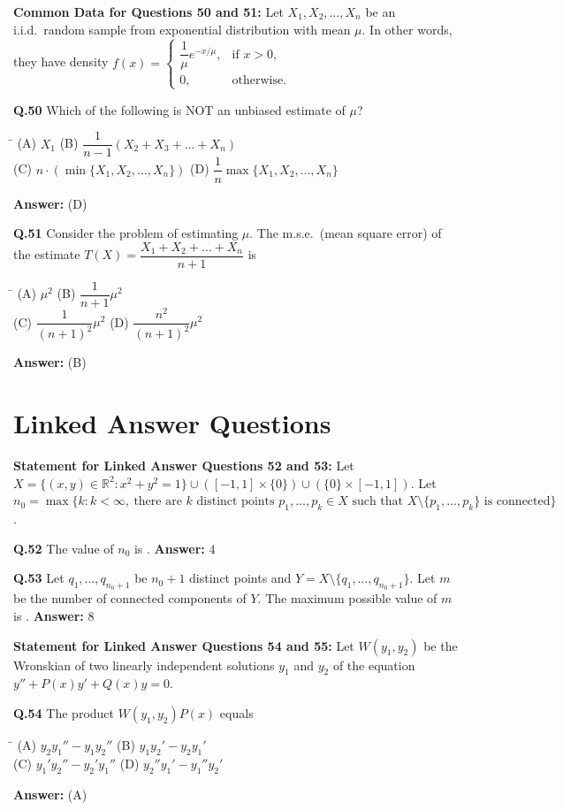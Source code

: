 \documentclass[11pt,a4paper]{article}
\newcommand{\optsfourA}[4]{%
  \begin{tabbing}
    \hspace{0.48\linewidth}\=\kill
    (A) #1 \> (B) #2 \\[2pt]
    (C) #3 \> (D) #4
  \end{tabbing}%
}
\newcommand{\ans}[1]{\textbf{Answer:} #1\par\medskip}
\begin{document}
\medskip
\textbf{Common Data for Questions 50 and 51:}
Let $X_1, X_2, \dots, X_n$ be an i.i.d.\ random sample from exponential distribution with mean $\mu$. In other words, they have density $f(x) = \begin{cases} \dfrac{1}{\mu}e^{-x/\mu}, & \text{if } x > 0, \\ 0, & \text{otherwise.} \end{cases}$

\textbf{Q.50} Which of the following is NOT an unbiased estimate of $\mu$?
\optsfourA{$X_1$}{$\dfrac{1}{n - 1}(X_2 + X_3 + \dots + X_n)$}{$n \cdot (\min\{X_1, X_2, \dots, X_n\})$}{$\dfrac{1}{n}\max\{X_1, X_2, \dots, X_n\}$}
\ans{(D)}

\textbf{Q.51} Consider the problem of estimating $\mu$. The m.s.e.\ (mean square error) of the estimate $T(X) = \dfrac{X_1 + X_2 + \dots + X_n}{n + 1}$ is
\optsfourA{$\mu^2$}{$\dfrac{1}{n + 1}\mu^2$}{$\dfrac{1}{(n + 1)^2}\mu^2$}{$\dfrac{n^2}{(n + 1)^2}\mu^2$}
\ans{(B)}

\section*{Linked Answer Questions}

\textbf{Statement for Linked Answer Questions 52 and 53:}
Let $X = \{(x, y) \in \mathbb{R}^2 : x^2 + y^2 = 1\} \cup ([-1, 1] \times \{0\}) \cup (\{0\} \times [-1, 1])$. Let $n_0 = \max\{k : k < \infty,\ \text{there are } k \text{ distinct points } p_1, \dots, p_k \in X \text{ such that } X \setminus \{p_1, \dots, p_k\} \text{ is connected}\}$.

\textbf{Q.52} The value of $n_0$ is \underline{\hspace{2cm}}.
\ans{$4$}

\textbf{Q.53} Let $q_1, \dots, q_{n_0 + 1}$ be $n_0 + 1$ distinct points and $Y = X \setminus \{q_1, \dots, q_{n_0 + 1}\}$. Let $m$ be the number of connected components of $Y$. The maximum possible value of $m$ is \underline{\hspace{2cm}}.
\ans{$8$}

\medskip
\textbf{Statement for Linked Answer Questions 54 and 55:}
Let $W(y_1, y_2)$ be the Wronskian of two linearly independent solutions $y_1$ and $y_2$ of the equation $y'' + P(x)y' + Q(x)y = 0$.

\textbf{Q.54} The product $W(y_1, y_2)P(x)$ equals
\optsfourA{$y_2 y_1'' - y_1 y_2''$}{$y_1 y_2' - y_2 y_1'$}{$y_1' y_2'' - y_2' y_1''$}{$y_2'' y_1' - y_1'' y_2'$}
\ans{(A)}
\end{document}
